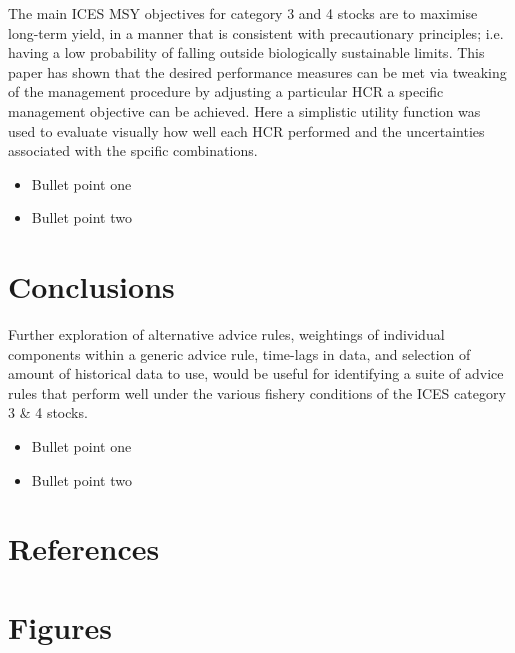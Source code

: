 \documentclass[preprint,12pt]{elsarticle}
\begin{document}
The main ICES MSY objectives for category 3 and 4 stocks are to maximise long-term yield, in a manner that is consistent with precautionary principles; i.e. having a low probability of falling outside biologically sustainable limits.  This paper has shown that the desired performance measures can be met via tweaking of the management procedure by adjusting a particular HCR a specific management objective can be achieved. Here a simplistic utility function was used to evaluate visually how well each HCR performed and the uncertainties associated with the spcific combinations.




\begin{itemize}
\item Bullet point one
\item Bullet point two
\end{itemize}

\section{Conclusions}
Further exploration of alternative advice rules, weightings of individual components within a generic advice rule, time-lags in data, and selection of amount of historical data to use, would be useful for identifying a suite of advice rules that perform well under the various fishery conditions of the ICES category 3 & 4 stocks.

\begin{itemize}
\item Bullet point one
\item Bullet point two
\end{itemize}

\section{References}


 

\section{Figures}
\end{document}

